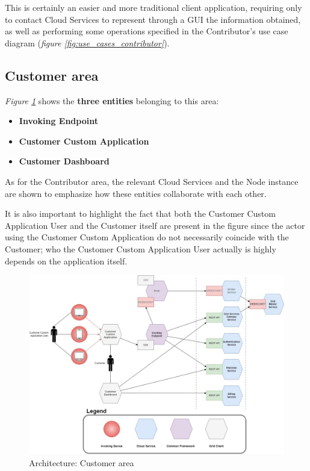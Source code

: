 This is certainly an easier and more traditional client application, requiring only to contact Cloud Services to represent through a GUI the information obtained, as well as performing some operations specified in the Contributor's use case diagram (\textit{figure \ref{fig:use_cases_contributor}}). 

\subsection{Customer area}\label{customer_area}
\textit{Figure \ref{fig:architecture_customer}} shows the \textbf{three entities} belonging to this area:
\begin{itemize}
    \item \textbf{Invoking Endpoint}
    \item \textbf{Customer Custom Application}
    \item \textbf{Customer Dashboard}
\end{itemize}
As for the Contributor area, the relevant Cloud Services and the Node instance are shown to emphasize how these entities collaborate with each other.

It is also important to highlight the fact that both the Customer Custom Application User and the Customer itself are present in the figure since the actor using the Customer Custom Application do not necessarily coincide with the Customer; who the Customer Custom Application User actually is highly depends on the application itself.
\vspace{8mm}

\begin{figure}[!ht]
    \centering
    \includegraphics[width=\linewidth]{document/chapters/chapter_6/images/architecture_customer.jpg}
    \caption{Architecture: Customer area}
    \label{fig:architecture_customer}
\end{figure}

